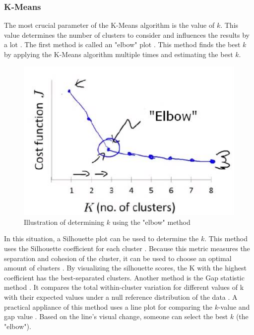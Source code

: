 \subsubsection{K-Means} \label{theory:kmeans}
The most crucial parameter of the K-Means algorithm is the value of $k$.
This value determines the number of clusters to consider and influences the results by a lot \citep{ahmed_k-means_2020}.
The first method is called an "elbow" plot \citep{kodinariya_review_2013}.
This method finds the best $k$ by applying the K-Means algorithm multiple times and estimating the best $k$.
\begin{figure}[H]
  \includegraphics{TheorethicalFramework/dentification-of-Elbow-point.png}
  \caption{Illustration of determining $k$ using the "elbow" method \citep{kodinariya_review_2013}}
\end{figure}
In this situation, a Silhouette plot can be used to determine the $k$.
This method uses the Silhouette coefficient for each cluster \citep{saputra_effect_2020}.
Because this metric measures the separation and cohesion of the cluster, it can be used to choose an optimal amount of clusters \citep{saputra_effect_2020}.
By visualizing the silhouette scores, the K with the highest coefficient has the best-separated clusters. \newline
Another method is the Gap statistic method \citep{yuan_research_2019}.
It compares the total within-cluster variation for different values of k with their expected values under a null reference distribution of the data \citep{tibshirani_estimating_2001}.
A practical appliance of this method uses a line plot for comparing the $k$-value and gap value \citep{yuan_research_2019}.
Based on the line's visual change, someone can select the best $k$ (the "elbow").

